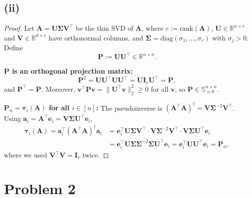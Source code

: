 \documentclass[12pt]{article}
\begin{document}
\subsection*{(ii)}

\begin{proof}
Let $\mathbf{A} = \mathbf{U}\boldsymbol{\Sigma}\mathbf{V}^\top$ be the thin SVD of $\mathbf{A}$, where $r := \mathrm{rank}(\mathbf{A})$, $\mathbf{U} \in \mathbb{R}^{n \times r}$ and $\mathbf{V} \in \mathbb{R}^{d \times r}$ have orthonormal columns, and $\boldsymbol{\Sigma} = \mathrm{diag}(\sigma_1,\ldots,\sigma_r)$ with $\sigma_j > 0$. Define
\[
    \mathbf{P} := \mathbf{U}\mathbf{U}^\top \in \mathbb{R}^{n \times n}.
\]

\textbf{$\mathbf{P}$ is an orthogonal projection matrix:}
\[
    \mathbf{P}^2 = \mathbf{U}\mathbf{U}^\top\mathbf{U}\mathbf{U}^\top = \mathbf{U}\mathbf{I}_r\mathbf{U}^\top = \mathbf{P},
\]
and $\mathbf{P}^\top = \mathbf{P}$. Moreover, $\mathbf{v}^\top \mathbf{P} \mathbf{v} = \|\mathbf{U}^\top \mathbf{v}\|_2^2 \geq 0$ for all $\mathbf{v}$, so $\mathbf{P} \in \mathbb{S}_{\succeq 0}^{n \times n}$.

\textbf{$\mathbf{P}_{ii} = \boldsymbol{\tau}_i(\mathbf{A})$ for all $i \in [n]$:} The pseudoinverse is $(\mathbf{A}^\top\mathbf{A})^\dagger = \mathbf{V}\boldsymbol{\Sigma}^{-2}\mathbf{V}^\top$. Using $\mathbf{a}_i = \mathbf{A}^\top \mathbf{e}_i = \mathbf{V}\boldsymbol{\Sigma}\mathbf{U}^\top\mathbf{e}_i$,
\begin{align*}
    \boldsymbol{\tau}_i(\mathbf{A})
    = \mathbf{a}_i^\top (\mathbf{A}^\top\mathbf{A})^\dagger \mathbf{a}_i
    &= \mathbf{e}_i^\top \mathbf{U}\boldsymbol{\Sigma}\mathbf{V}^\top \cdot \mathbf{V}\boldsymbol{\Sigma}^{-2}\mathbf{V}^\top \cdot \mathbf{V}\boldsymbol{\Sigma}\mathbf{U}^\top\mathbf{e}_i \\
    &= \mathbf{e}_i^\top \mathbf{U}\boldsymbol{\Sigma}\boldsymbol{\Sigma}^{-2}\boldsymbol{\Sigma}\mathbf{U}^\top\mathbf{e}_i
    = \mathbf{e}_i^\top \mathbf{U}\mathbf{U}^\top\mathbf{e}_i
    = \mathbf{P}_{ii},
\end{align*}
where we used $\mathbf{V}^\top\mathbf{V} = \mathbf{I}_r$ twice.
\end{proof}

\section*{Problem 2}
\end{document}
